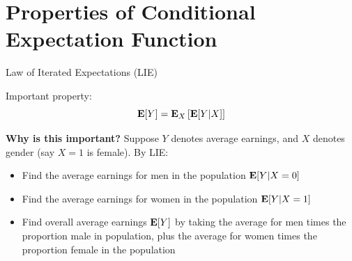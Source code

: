 \documentclass[compress, 8pt]{beamer}
\begin{document}
\section[CEF Properties]{Properties of Conditional Expectation Function}
\miniframesoff
\begin{frame}
    \tableofcontents[currentsection]
\end{frame}
\miniframeson


\begin{frame}{Law of Iterated Expectations (LIE)}

    Important property: 
    \begin{equation*}
    \mathbf{E} [Y] = \mathbf{E}_X \left[ \mathbf{E} [Y \vert X] \right]
\end{equation*}

\vspace{2ex}
\textbf{Why is this important?} Suppose $Y$ denotes average earnings, and $X$ denotes gender (say $X=1$ is female). By LIE:
\begin{itemize}
    \item Find the average earnings for men in the population $\mathbf{E} [Y \vert X = 0]$
    \item Find the average earnings for women in the population $\mathbf{E} [Y \vert X = 1]$
    \item Find overall average earnings $\mathbf{E} [Y]$ by taking the average for men times the proportion male in population, plus the average for women times the proportion female in the population
\end{itemize}

\end{frame}
\end{document}
